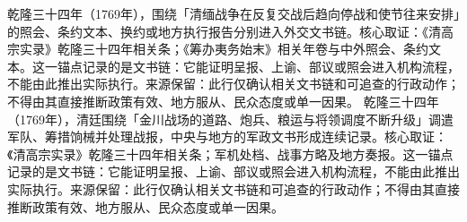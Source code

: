乾隆三十四年（1769年），围绕「清缅战争在反复交战后趋向停战和使节往来安排」的照会、条约文本、换约或地方执行报告分别进入外交文书链。核心取证：《清高宗实录》乾隆三十四年相关条；《筹办夷务始末》相关年卷与中外照会、条约文本。这一锚点记录的是文书链：它能证明呈报、上谕、部议或照会进入机构流程，不能由此推出实际执行。来源保留：此行仅确认相关文书链和可追查的行政动作；不得由其直接推断政策有效、地方服从、民众态度或单一因果。
乾隆三十四年（1769年），清廷围绕「金川战场的道路、炮兵、粮运与将领调度不断升级」调遣军队、筹措饷械并处理战报，中央与地方的军政文书形成连续记录。核心取证：《清高宗实录》乾隆三十四年相关条；军机处档、战事方略及地方奏报。这一锚点记录的是文书链：它能证明呈报、上谕、部议或照会进入机构流程，不能由此推出实际执行。来源保留：此行仅确认相关文书链和可追查的行政动作；不得由其直接推断政策有效、地方服从、民众态度或单一因果。
